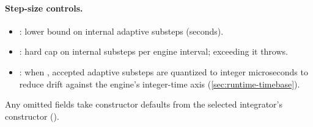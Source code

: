 \paragraph{Step-size controls.}
\begin{itemize}[leftmargin=*,itemsep=2pt]
  \item {}: lower bound on internal adaptive substeps (seconds).
  \item {}: hard cap on internal substeps per engine interval; exceeding it throws.
  \item {}: when , accepted adaptive substeps are quantized to integer microseconds to reduce drift against the engine's integer-time axis (\cref{sec:runtime-timebase}).
\end{itemize}

Any omitted fields take constructor defaults from the selected integrator's constructor ().
